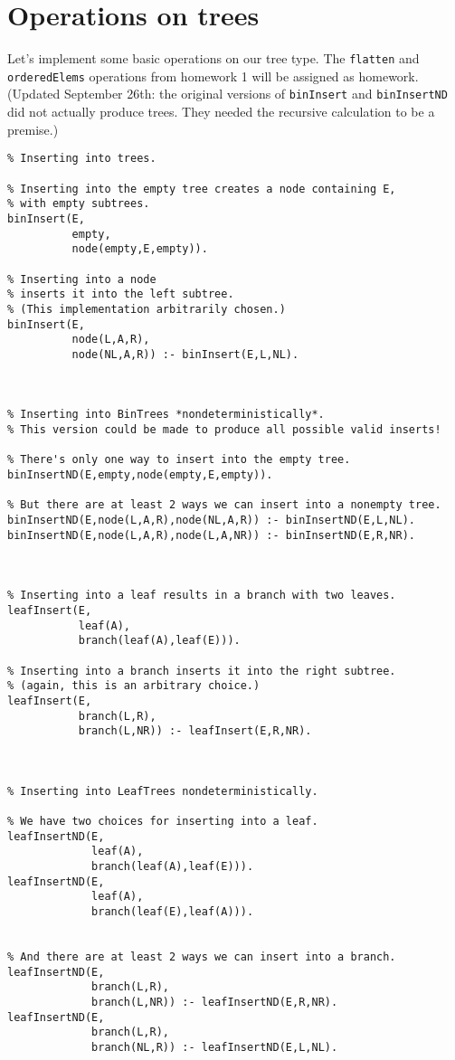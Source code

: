 \documentclass[11pt]{article}
\begin{document}
\section{Operations on trees}
\label{sec:orgca888fa}
Let's implement some basic operations on our tree type.
The \texttt{flatten} and \texttt{orderedElems} operations
from homework 1 will be assigned as homework.
(Updated September 26th: the original versions
of \texttt{binInsert} and \texttt{binInsertND} did not actually produce trees.
They needed the recursive calculation to be a premise.)
\begin{verbatim}
% Inserting into trees.

% Inserting into the empty tree creates a node containing E,
% with empty subtrees.
binInsert(E,
          empty,
          node(empty,E,empty)).

% Inserting into a node
% inserts it into the left subtree.
% (This implementation arbitrarily chosen.)
binInsert(E,
          node(L,A,R),
          node(NL,A,R)) :- binInsert(E,L,NL).



% Inserting into BinTrees *nondeterministically*.
% This version could be made to produce all possible valid inserts!

% There's only one way to insert into the empty tree.
binInsertND(E,empty,node(empty,E,empty)).

% But there are at least 2 ways we can insert into a nonempty tree.
binInsertND(E,node(L,A,R),node(NL,A,R)) :- binInsertND(E,L,NL).
binInsertND(E,node(L,A,R),node(L,A,NR)) :- binInsertND(E,R,NR).



% Inserting into a leaf results in a branch with two leaves.
leafInsert(E,
           leaf(A),
           branch(leaf(A),leaf(E))).

% Inserting into a branch inserts it into the right subtree.
% (again, this is an arbitrary choice.)
leafInsert(E,
           branch(L,R),
           branch(L,NR)) :- leafInsert(E,R,NR).



% Inserting into LeafTrees nondeterministically.

% We have two choices for inserting into a leaf.
leafInsertND(E,
             leaf(A),
             branch(leaf(A),leaf(E))).
leafInsertND(E,
             leaf(A),
             branch(leaf(E),leaf(A))).


% And there are at least 2 ways we can insert into a branch.
leafInsertND(E,
             branch(L,R),
             branch(L,NR)) :- leafInsertND(E,R,NR).
leafInsertND(E,
             branch(L,R),
             branch(NL,R)) :- leafInsertND(E,L,NL).
\end{verbatim}
\end{document}
